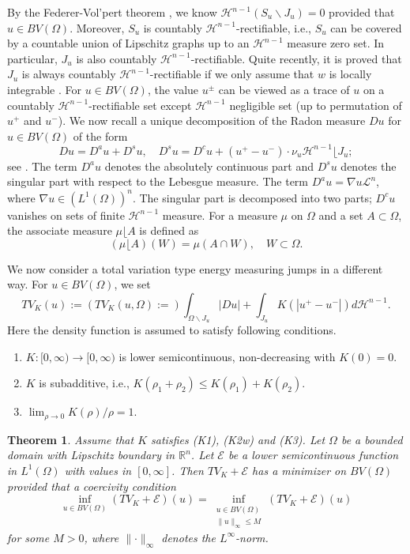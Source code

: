 \documentclass[11pt]{amsart} %
\numberwithin{equation}{section}
\newtheorem{thm}{Theorem}[section]
\begin{document}
By the Federer-Vol'pert theorem \cite[Theorem 3.78]{AFP}, we know $\mathcal{H}^{n-1}(S_u\backslash J_u)=0$ provided that $u\in BV(\Omega)$.
 Moreover, $S_u$ is countably $\mathcal{H}^{n-1}$-rectifiable, i.e., $S_u$ can be covered by a countable union of Lipschitz graphs up to an $\mathcal{H}^{n-1}$ measure zero set.
 In particular, $J_u$ is also countably $\mathcal{H}^{n-1}$-rectifiable.
 Quite recently, it is proved that $J_u$ is always countably $\mathcal{H}^{n-1}$-rectifiable if we only assume that $w$ is locally integrable \cite{DN}.
 For $u\in BV(\Omega)$, the value $u^\pm$ can be viewed as a trace of $u$ on a countably $\mathcal{H}^{n-1}$-rectifiable set \cite[Theorem 3.77, Remark 3.79]{AFP} except $\mathcal{H}^{n-1}$ negligible set (up to permutation of $u^+$ and $u^-$).
 We now recall a unique decomposition of the Radon measure $Du$ for $u\in BV(\Omega)$ of the form
\[
	Du = D^a u + D^s u, \quad
	D^s u = D^c u + (u^+ - u^-) \cdot \nu_u \mathcal{H}^{n-1} \lfloor J_u;
\]
 see \cite[Section 3.8]{AFP}.
 The term $D^au$ denotes the absolutely continuous part and $D^su$ denotes the singular part with respect to the Lebesgue measure.
 The term $D^au=\nabla u\mathcal{L}^n$, where $\nabla u\in\left(L^1(\Omega)\right)^n$.
 The singular part is decomposed into two parts; $D^cu$ vanishes on sets of finite $\mathcal{H}^{n-1}$ measure.
 For a measure $\mu$ on $\Omega$ and a set $A\subset\Omega$, the associate measure $\mu\lfloor A$ is defined as
\[
	(\mu \lfloor A)(W) = \mu(A \cap W), \quad
	W \subset \Omega.
\]

We now consider a total variation type energy measuring jumps in a different way.
 For $u\in BV(\Omega)$, we set
\[
	TV_K(u) := \left( TV_K(u,\Omega) := \right) \int_{\Omega\backslash J_u} |Du|
	+ \int_{J_u} K \left(|u^+ - u^-|\right) d\mathcal{H}^{n-1}.
\]
Here the density function is assumed to satisfy following conditions.
\begin{enumerate}
\item[(K1)] $K:[0,\infty)\to[0,\infty)$ is lower semicontinuous, non-decreasing with $K(0)=0$.
\item[(K2w)] $K$ is subadditive, i.e., $K(\rho_1+\rho_2)\leq K(\rho_1)+K(\rho_2)$.
\item[(K3)] $\lim_{\rho\to0} K(\rho)/\rho=1$.
\end{enumerate}
%
\begin{thm} \label{TEx1}
Assume that $K$ satisfies (K1), (K2w) and (K3).
 Let $\Omega$ be a bounded domain with Lipschitz boundary in $\mathbb{R}^n$.
 Let $\mathcal{E}$ be a lower semicontinuous function in $L^1(\Omega)$ with values in $[0,\infty]$.
 Then $TV_K+\mathcal{E}$ 
has a  minimizer on $BV(\Omega)$ provided that a coercivity condition
\[
	\inf_{u\in BV(\Omega)} (TV_K + \mathcal{E})(u)
	= \inf_{\substack{u\in BV(\Omega) \\ \lVert u\rVert_\infty\leq M}} (TV_K + \mathcal{E})(u)
\]
for some $M>0$, where $\lVert\cdot\rVert_\infty$ denotes the $L^\infty$-norm.
\end{thm}
\end{document}
